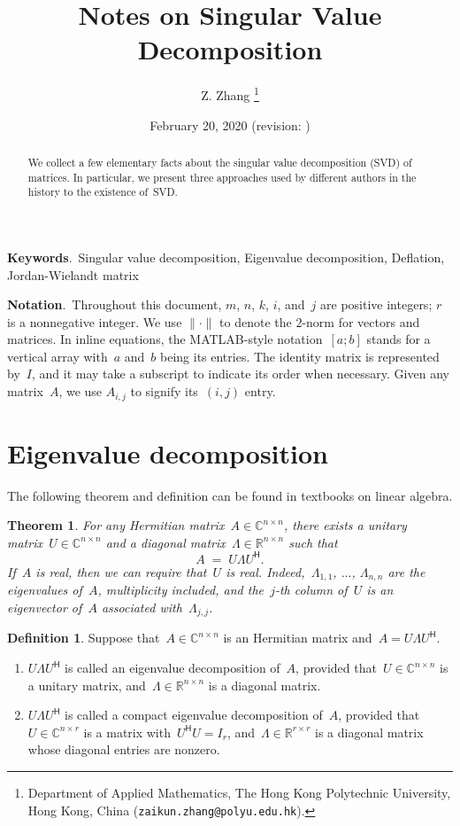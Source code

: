 \documentclass[11pt,a4paper]{article}  %
\title{Notes on Singular Value Decomposition}
\date{February 20, 2020 (revision: \DTMnow)}
\author{
Z. Zhang
\thanks{
Department of Applied Mathematics, The Hong Kong Polytechnic University,
Hong Kong, China ({\tt zaikun.zhang@polyu.edu.hk}).
}
}
\numberwithin{equation}{section}
\newtheorem{theorem}{Theorem}%
\theoremstyle{definition}
\newtheorem{definition}{Definition}%
\def\RR{\mathbb{R}}
\def\CC{\mathbb{C}}
\newcommand{\hmt}{{\scriptscriptstyle{{\mathsf{H}}}}}
\begin{document}
\maketitle

\begin{abstract}
  We collect a few elementary facts about the singular value decomposition (SVD) of matrices. In
  particular, we present three approaches used by different authors in the history
  to the existence of~SVD.
\end{abstract}

\textbf{Keywords}.~Singular value decomposition, Eigenvalue decomposition, Deflation,
Jordan-Wielandt matrix

\textbf{Notation}.~Throughout this document, $m$, $n$, $k$, $i$, and~$j$ are positive integers; $r$ is a nonnegative integer.
We use $\|\cdot\|$ to denote the $2$-norm for vectors and matrices.
In inline equations, the MATLAB-style notation~$[a; b]$ stands for a vertical array
with~$a$ and~$b$ being its entries. The identity matrix is represented by~$I$, and it may take
a subscript to indicate its order when necessary. Given any matrix~$A$, we use $A_{i,j}$ to signify
its~$(i,j)$ entry.

\section{Eigenvalue decomposition}

The following theorem and definition can be found in textbooks on linear algebra.
\begin{theorem}
  \label{th:evd}
  For any Hermitian matrix~$A\in \CC^{n\times n}$, there exists a unitary matrix~$U\in
  \CC^{n\times n}$ and a diagonal matrix~$\Lambda \in \RR^{n\times n}$ such that
  \begin{equation*}
    A \; = \; U\Lambda U^\hmt.
  \end{equation*}
  If~$A$ is real, then we can require that~$U$ is real.
  Indeed,~$\Lambda_{1,1}$, $\dots$, $\Lambda_{n,n}$ are the eigenvalues of~$A$, multiplicity
  included, and the~$j$-th column of~$U$ is an eigenvector of~$A$ associated with~$\Lambda_{j,j}$.
\end{theorem}

\begin{definition}
  \label{def:evd}
  Suppose that~$A\in \CC^{n\times n}$ is an Hermitian matrix and~$A = U\Lambda U^\hmt$.
  \begin{enumerate}[leftmargin=1.5em]
    \item
      $U\Lambda U^\hmt$ is called an eigenvalue decomposition of~$A$, provided that~$U
      \in \CC^{n\times n}$ is a unitary matrix, and~$\Lambda \in \RR^{n\times n}$ is a diagonal
      matrix.
    \item
      $U\Lambda U^\hmt$ is called a compact eigenvalue decomposition of~$A$,
      provided that~$U \in \CC^{n\times r}$ is a matrix with~$U^\hmt U = I_r$,
      and~$\Lambda \in \RR^{r\times r}$ is a diagonal matrix whose diagonal entries are nonzero.
  \end{enumerate}
\end{definition}
\end{document}
